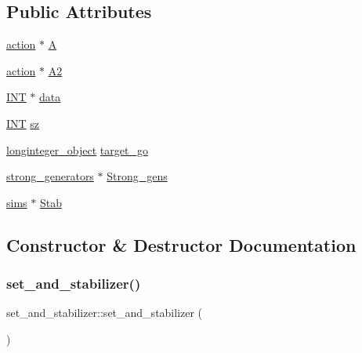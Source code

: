 \subsection*{Public Attributes}
\begin{DoxyCompactItemize}
\item 
\mbox{\hyperlink{classaction}{action}} $\ast$ \mbox{\hyperlink{classset__and__stabilizer_a01e42608b1227afa8f50b8c779a70631}{A}}
\item 
\mbox{\hyperlink{classaction}{action}} $\ast$ \mbox{\hyperlink{classset__and__stabilizer_ac955d7310c2a85963290539b5f7b3b6f}{A2}}
\item 
\mbox{\hyperlink{galois_8h_a09fddde158a3a20bd2dcadb609de11dc}{I\+NT}} $\ast$ \mbox{\hyperlink{classset__and__stabilizer_af2753d24bd8d6065ea19a46d3175cf1e}{data}}
\item 
\mbox{\hyperlink{galois_8h_a09fddde158a3a20bd2dcadb609de11dc}{I\+NT}} \mbox{\hyperlink{classset__and__stabilizer_a5b416393c4d6db291c35d6e831ffbf4a}{sz}}
\item 
\mbox{\hyperlink{classlonginteger__object}{longinteger\+\_\+object}} \mbox{\hyperlink{classset__and__stabilizer_add16044e2efa05779e8a80366780d787}{target\+\_\+go}}
\item 
\mbox{\hyperlink{classstrong__generators}{strong\+\_\+generators}} $\ast$ \mbox{\hyperlink{classset__and__stabilizer_a6fbc7f8fefa40ac232a33f8d16807778}{Strong\+\_\+gens}}
\item 
\mbox{\hyperlink{classsims}{sims}} $\ast$ \mbox{\hyperlink{classset__and__stabilizer_a98b839ea868913eb9658b74a7d992ed3}{Stab}}
\end{DoxyCompactItemize}


\subsection{Constructor \& Destructor Documentation}
\mbox{\label{classset__and__stabilizer_a3874b55426db380af242fcd3f75fbc34}} 
\subsubsection{\texorpdfstring{set\+\_\+and\+\_\+stabilizer()}{set\_and\_stabilizer()}}
{\footnotesize\ttfamily set\+\_\+and\+\_\+stabilizer\+::set\+\_\+and\+\_\+stabilizer (\begin{DoxyParamCaption}{ }\end{DoxyParamCaption})}

